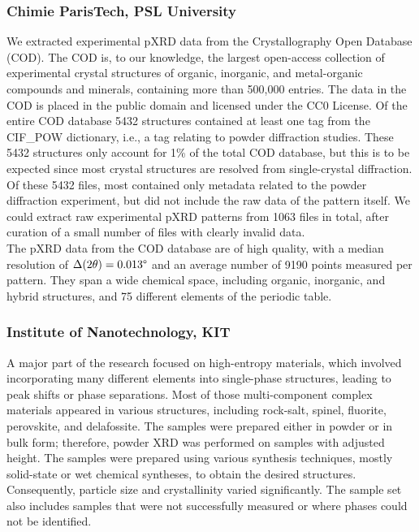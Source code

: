\subsubsection*{Chimie ParisTech, PSL University}

We extracted experimental pXRD data from the Crystallography Open Database (COD)\cite{Grazulis2009, Vaitkus2023}. The COD is, to our knowledge, the largest open-access collection of experimental crystal structures of organic, inorganic, and metal-organic compounds and minerals, containing more than 500,000 entries. The data in the COD is placed in the public domain and licensed under the CC0 License. Of the entire COD database 5432 structures contained at least one tag from the {CIF\_POW} dictionary, i.e., a tag relating to powder diffraction studies. These 5432 structures only account for 1\% of the total COD database, but this is to be expected since most crystal structures are resolved from single-crystal diffraction. Of these 5432 files, most contained only metadata related to the powder diffraction experiment, but did not include the raw data of the pattern itself. We could extract raw experimental pXRD patterns from 1063 files in total, after curation of a small number of files with clearly invalid data. \\

The pXRD data from the COD database are of high quality, with a median resolution of $\Delta(2\theta) = 0.013\degree$ and an average number of 9190 points measured per pattern. They span a wide chemical space, including organic, inorganic, and hybrid structures, and 75 different elements of the periodic table.

\subsubsection*{Institute of Nanotechnology, KIT}

A major part of the research focused on high-entropy materials, which involved incorporating many different elements into single-phase structures, leading to peak shifts or phase separations. Most of those multi-component complex materials appeared in various structures, including rock-salt, spinel, fluorite, perovskite, and delafossite. The samples were prepared either in powder or in bulk form; therefore, powder XRD was performed on samples with adjusted height. The samples were prepared using various synthesis techniques, mostly solid-state or wet chemical syntheses, to obtain the desired structures. Consequently, particle size and crystallinity varied significantly. The sample set also includes samples that were not successfully measured or where phases could not be identified. \\

